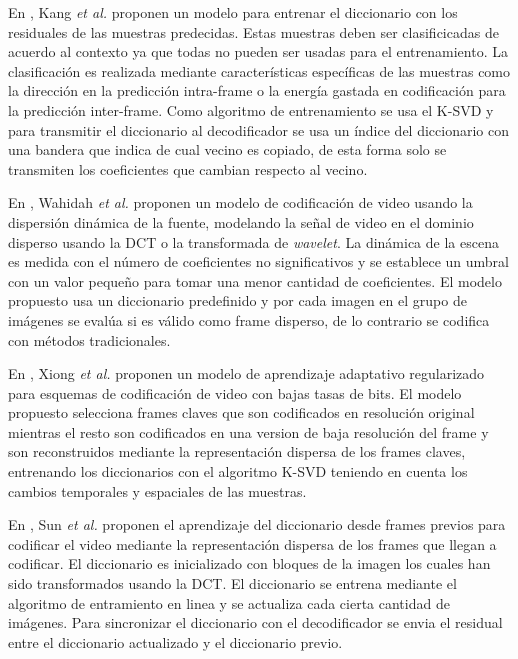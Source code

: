 En \cite{kang_efficient_2011}, Kang \textit{et al.} proponen un modelo para entrenar el diccionario con los residuales de las muestras predecidas. Estas muestras deben ser clasificicadas de acuerdo al contexto ya que todas no pueden ser usadas para el entrenamiento. La clasificaci\'on es realizada mediante caracter\'isticas espec\'ificas de las muestras como la direcci\'on en la predicci\'on intra-frame o la energ\'ia gastada en codificaci\'on para la predicci\'on inter-frame. Como algoritmo de entrenamiento se usa el K-SVD  y para transmitir el diccionario al decodificador se usa un \'indice del diccionario con una bandera que indica de cual vecino es copiado, de esta forma solo se transmiten los coeficientes que cambian respecto al vecino.

En \cite{wahidah_compressive_2012}, Wahidah \textit{et al.} proponen un modelo de codificaci\'on de video usando la dispersi\'on din\'amica de la fuente, modelando la se\~nal de video en el dominio disperso usando la DCT o la transformada de \textit{wavelet}. La din\'amica de la escena es medida con el n\'umero de coeficientes no significativos y se establece un umbral con un valor peque\~no para tomar una menor cantidad de coeficientes. El modelo propuesto usa un diccionario predefinido y por cada imagen en el grupo de im\'agenes se eval\'ua si es v\'alido como frame disperso, de lo contrario se codifica con m\'etodos tradicionales.  

En \cite{xiong2013sparse}, Xiong \textit{et al.} proponen un modelo de aprendizaje adaptativo regularizado para esquemas de codificaci\'on de video con bajas tasas de bits. El modelo propuesto selecciona  frames claves que son codificados en resoluci\'on original mientras el resto son codificados en una version de baja resoluci\'on del frame y son reconstruidos mediante la representaci\'on dispersa  de los frames claves, entrenando los diccionarios con el algoritmo K-SVD teniendo en cuenta los cambios temporales y espaciales de las muestras.

En \cite{sun2012online}, Sun \textit{et al.} proponen el aprendizaje del diccionario desde frames previos para codificar  el video mediante la representaci\'on dispersa de los frames que llegan a codificar. El diccionario es inicializado con bloques de la imagen los cuales han sido transformados usando la DCT. El diccionario se entrena mediante el algoritmo de entramiento en linea y se actualiza cada cierta cantidad de im\'agenes. Para sincronizar el diccionario con el decodificador se envia el residual entre el diccionario actualizado y el diccionario previo.


